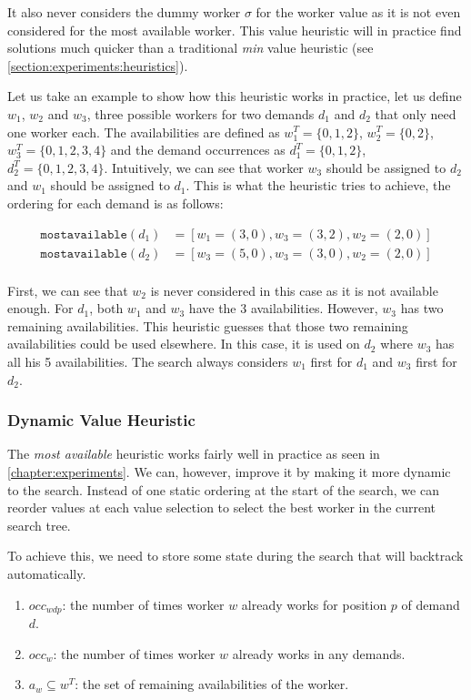 \documentclass[../../thesis.tex]{subfiles}
\begin{document}
It also never considers the dummy worker $\sigma$ for the worker value as it is not even considered 
for the most available worker. This value heuristic will in practice find solutions much quicker than a traditional \emph{min} value heuristic 
(see \autoref{section:experiments:heuristics}).

Let us take an example to show how this heuristic works in practice, let us define 
$w_1$, $w_2$ and $w_3$, three possible workers for two demands $d_1$ and $d_2$ that only need one worker each.
The availabilities are defined as
$w_1^T = \{ 0, 1, 2 \}$, $w_2^T = \{ 0, 2 \}$, $w_3^T = \{ 0, 1, 2, 3, 4\}$ and the demand occurrences as 
$d_1^T = \{ 0, 1, 2 \}$, $d_2^T = \{ 0, 1, 2, 3, 4 \}$. Intuitively, we can see that worker 
$w_3$ should be assigned to $d_2$ and $w_1$ should be assigned to $d_1$. This is what the heuristic tries to achieve, the ordering for each demand is as follows:

\begin{align*}
  \texttt{mostavailable}(d_1) &= [w_1 = (3, 0), w_3 = (3, 2), w_2 = (2, 0)] \\ 
  \texttt{mostavailable}(d_2) &= [w_3 = (5, 0), w_3 = (3, 0), w_2 = (2, 0)] \\ 
\end{align*}

First, we can see that $w_2$ is never considered in this case as it is not available enough. For $d_1$, both $w_1$ and $w_3$ have the 3 availabilities. However, 
$w_3$ has two remaining availabilities. This heuristic guesses that those two remaining availabilities could be used elsewhere. In this case, it is used on $d_2$ where $w_3$ has all his 5 availabilities.
The search always considers $w_1$ first for $d_1$ and $w_3$ first for $d_2$.

\subsubsection{Dynamic Value Heuristic}

The \emph{most available} heuristic works fairly well in practice as seen in \autoref{chapter:experiments}. 
We can, however, improve it by making it more dynamic to the search. Instead of one static ordering at the start of the search,
we can reorder values at each value selection to select the best worker in the current search tree.

To achieve this, we need to store some state during the search that will backtrack automatically.

\begin{enumerate}
  \item $occ_{wdp}$: the number of times worker $w$ already works for position $p$ of demand $d$.
  \item $occ_{w}$: the number of times worker $w$ already works in any demands.
  \item $a_{w} \subseteq w^T$: the set of remaining availabilities of the worker.
\end{enumerate}
\end{document}
